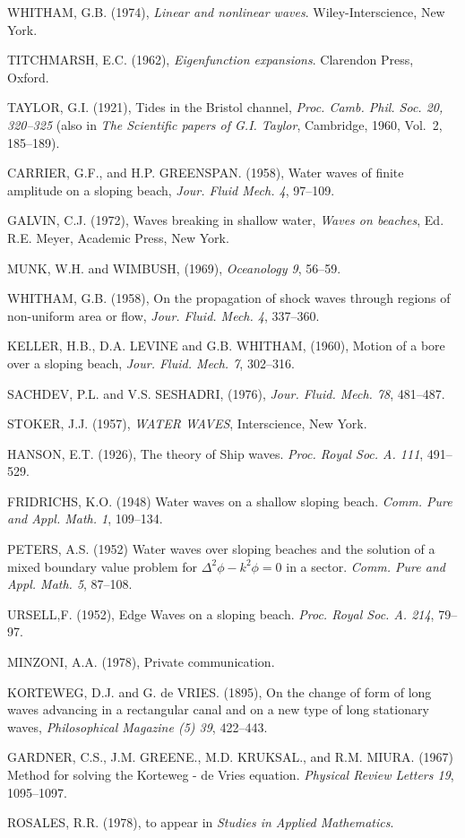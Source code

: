 \begin{thebibliography}{99}\pageoriginale
{} WHITHAM, G.B. (1974), \emph{Linear and nonlinear waves}. Wiley-Interscience, New York.

 TITCHMARSH, E.C. (1962), \emph{Eigenfunction expansions}. Clarendon Press, Oxford.

 TAYLOR, G.I. (1921), Tides in the Bristol channel, \emph{Proc. Camb. Phil. Soc. 20, 320--325} (also in \emph{The Scientific papers of G.I. Taylor}, Cambridge, 1960, Vol.~2, 185--189).

 CARRIER, G.F., and H.P. GREENSPAN. (1958), Water waves of finite amplitude on a sloping beach, \emph{Jour. Fluid Mech. 4}, 97--109.

 GALVIN, C.J. (1972), Waves breaking in shallow water, \emph{Waves on beaches}, Ed. R.E. Meyer, Academic Press, New York.

 MUNK, W.H. and WIMBUSH, (1969), \emph{Oceanology 9}, 56--59.

 WHITHAM, G.B. (1958), On the propagation of shock waves through regions of non-uniform area or flow, \emph{Jour. Fluid. Mech. 4}, 337--360.

 KELLER, H.B., D.A. LEVINE and G.B. WHITHAM, (1960), Motion of a bore over a sloping beach, \emph{Jour. Fluid. Mech. 7}, 302--316.

 SACHDEV, P.L. and V.S. SESHADRI, (1976), \emph{Jour. Fluid. Mech. 78}, 481--487.

 STOKER, J.J. (1957), \emph{WATER WAVES}, Interscience, New York.

 HANSON, E.T. (1926), The theory of Ship waves. \emph{Proc. Royal Soc. A. 111}, 491--529.

 FRIDRICHS, K.O. (1948) Water waves on a shallow sloping beach. \emph{Comm. Pure and Appl. Math. 1}, 109--134.

 PETERS, A.S. (1952) Water waves over sloping beaches and the solution of a mixed boundary value problem for $\Delta^2\phi-k^2\phi=0$ in a sector. \emph{Comm. Pure and Appl. Math. 5}, 87--108.

 URSELL,\pageoriginale F. (1952), Edge Waves on a sloping beach. \emph{Proc. Royal Soc. A. 214}, 79--97.

 MINZONI, A.A. (1978), Private communication.

 KORTEWEG, D.J. and G. de VRIES. (1895), On the change of form of long waves advancing in a rectangular canal and on a new type of long stationary waves, \emph{Philosophical Magazine (5) 39}, 422--443.

 GARDNER, C.S., J.M. GREENE., M.D. KRUKSAL., and R.M. MIURA. (1967) Method for solving the Korteweg - de Vries equation. \emph{Physical Review Letters 19}, 1095--1097.

 ROSALES, R.R. (1978), to appear in \emph{Studies in Applied Mathematics}. 
\end{thebibliography}

